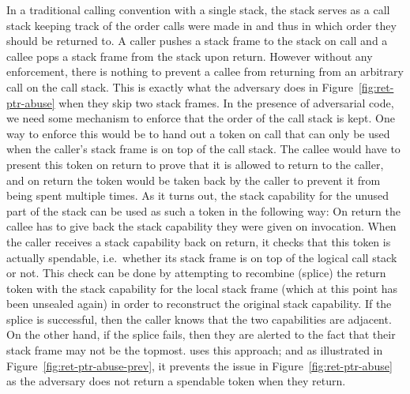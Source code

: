 \documentclass[acmsmall,screen]{acmart}\settopmatter{}
\begin{document}
In a traditional calling convention with a single stack, the stack serves as a call stack keeping track of the order calls were made in and thus in which order they should be returned to.
A caller pushes a stack frame to the stack on call and a callee pops a stack frame from the stack upon return.
However without any enforcement, there is nothing to prevent a callee from returning from an arbitrary call on the call stack.
This is exactly what the adversary does in Figure~\ref{fig:ret-ptr-abuse} when they skip two stack frames.
In the presence of adversarial code, we need some mechanism to enforce that the order of the call stack is kept.
One way to enforce this would be to hand out a token on call that can only be used when the caller's stack frame is on top of the call stack.
The callee would have to present this token on return to prove that it is allowed to return to the caller, and on return the token would be taken back by the caller to prevent it from being spent multiple times.
As it turns out, the stack capability for the unused part of the stack can be used as such a token in the following way:
On return the callee has to give back the stack capability they were given on invocation.
When the caller receives a stack capability back on return, it checks that this token is actually spendable, i.e.\ whether its stack frame is on top of the logical call stack or not.
This check can be done by attempting to recombine (splice) the return token with the stack capability for the local stack frame (which at this point has been unsealed again) in order to reconstruct the original stack capability.
If the splice is successful, then the caller knows that the two capabilities are adjacent. On the other hand, if the splice fails, then they are alerted to the fact that their stack frame may not be the topmost.
\stktokens{} uses this approach; and as illustrated in Figure~\ref{fig:ret-ptr-abuse-prev}, it prevents the issue in Figure~\ref{fig:ret-ptr-abuse} as the adversary does not return a spendable token when they return.
\end{document}

